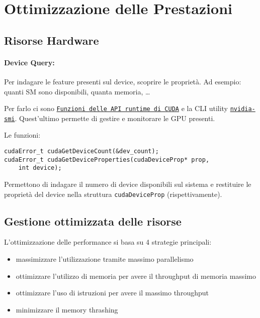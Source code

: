 \section{Ottimizzazione delle Prestazioni}

\subsection{Risorse Hardware}

\paragraph{Device Query:} Per indagare le feature presenti sul device, scoprire le proprietà. Ad esempio: quanti SM sono disponibili, quanta memoria, \dots

Per farlo ci sono \href{http://docs.nvidia.com/cuda/cuda-runtime-api}{\texttt{Funzioni delle API runtime di CUDA}} e la CLI utility \href{https://developer.nvidia.com/nvidia-system-management-interface}{\texttt{nvidia-smi}}. Quest'ultimo permette di gestire e monitorare le GPU presenti.

Le funzioni: 
\begin{verbatim}
cudaError_t cudaGetDeviceCount(&dev_count);
cudaError_t cudaGetDeviceProperties(cudaDeviceProp* prop,
    int device);
\end{verbatim}
Permettono di indagare il numero di device disponibili sul sistema e restituire le proprietà del device nella struttura \texttt{cudaDeviceProp} (rispettivamente).

\subsection{Gestione ottimizzata delle risorse}

L'ottimizzazione delle performance si basa su 4 strategie principali:
\begin{itemize}
	\item massimizzare l'utilizzazione tramite massimo parallelismo
	
	\item ottimizzare l'utilizzo di memoria per avere il throughput di memoria massimo
	
	\item ottimizzare l'uso di istruzioni per avere il massimo throughput
	
	\item minimizzare il memory thrashing
\end{itemize}

